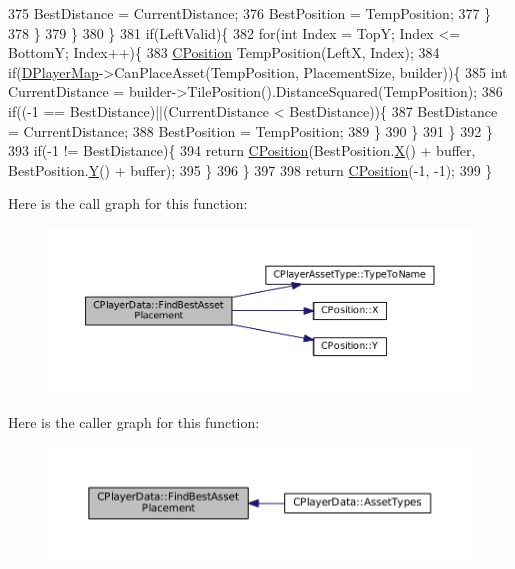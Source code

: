 \begin{DoxyCode}
375                         BestDistance = CurrentDistance;
376                         BestPosition = TempPosition;
377                     \}
378                 \}
379             \}
380         \}
381         \textcolor{keywordflow}{if}(LeftValid)\{
382            \textcolor{keywordflow}{for}(\textcolor{keywordtype}{int} Index = TopY; Index <= BottomY; Index++)\{
383                 \hyperlink{classCPosition}{CPosition} TempPosition(LeftX, Index);
384                 \textcolor{keywordflow}{if}(\hyperlink{classCPlayerData_a452163191cd4603e1e38dd8d4bb9691c}{DPlayerMap}->CanPlaceAsset(TempPosition, PlacementSize, builder))\{
385                     \textcolor{keywordtype}{int} CurrentDistance = builder->TilePosition().DistanceSquared(TempPosition);
386                     \textcolor{keywordflow}{if}((-1 == BestDistance)||(CurrentDistance < BestDistance))\{
387                         BestDistance = CurrentDistance;
388                         BestPosition = TempPosition;
389                     \}
390                 \}
391             \}
392         \}
393         \textcolor{keywordflow}{if}(-1 != BestDistance)\{
394             \textcolor{keywordflow}{return} \hyperlink{classCPosition}{CPosition}(BestPosition.\hyperlink{classCPosition_a9a6b94d3b91df1492d166d9964c865fc}{X}() + buffer, BestPosition.\hyperlink{classCPosition_a1aa8a30e2f08dda1f797736ba8c13a87}{Y}() + buffer); 
395         \}
396     \}
397     
398     \textcolor{keywordflow}{return} \hyperlink{classCPosition}{CPosition}(-1, -1);
399 \}
\end{DoxyCode}
Here is the call graph for this function\+:
\nopagebreak
\begin{figure}[H]
\begin{center}
\leavevmode
\includegraphics[width=350pt]{classCPlayerData_ac43ee660aa07b2d9d96eb5285d50fab5_cgraph}
\end{center}
\end{figure}
Here is the caller graph for this function\+:
\nopagebreak
\begin{figure}[H]
\begin{center}
\leavevmode
\includegraphics[width=350pt]{classCPlayerData_ac43ee660aa07b2d9d96eb5285d50fab5_icgraph}
\end{center}
\end{figure}
